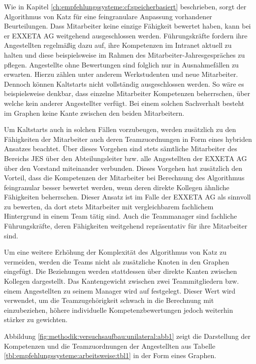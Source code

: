 Wie in Kapitel \ref{ch:empfehlungssysteme:cf:speicherbasiert} beschrieben, sorgt der Algorithmus von Katz für eine feingranulare Anpassung vorhandener Beurteilungen. Dass Mitarbeiter keine einzige Fähigkeit bewertet haben, kann bei er EXXETA AG weitgehend ausgeschlossen werden. Führungskräfte fordern ihre Angestellten regelmäßig dazu auf, ihre Kompetenzen im Intranet aktuell zu halten und diese beispielsweise im Rahmen des Mitarbeiter-Jahresgespräches zu pflegen. Angestellte ohne Bewertungen sind folglich nur in Ausnahmefällen zu erwarten. Hierzu zählen unter anderem Werkstudenten und neue Mitarbeiter. Dennoch können Kaltstarts nicht vollständig ausgeschlossen werden. So wäre es beispielsweise denkbar, dass einzelne Mitarbeiter Kompetenzen beherrschen, über welche kein anderer Angestellter verfügt. Bei einem solchen Sachverhalt besteht im Graphen keine Kante zwischen den beiden Mitarbeitern.

Um Kaltstarts auch in solchen Fällen vorzubeugen, werden zusätzlich zu den Fähigkeiten der Mitarbeiter auch deren Teamzuordnungen in Form eines hybriden Ansatzes beachtet. Über dieses Vorgehen sind stets sämtliche Mitarbeiter des Bereichs \acl{JES} über den Abteilungsleiter bzw. alle Angestellten der EXXETA AG über den Vorstand miteinander verbunden. Dieses Vorgehen hat zusätzlich den Vorteil, dass die Kompetenzen der Mitarbeiter bei Berechnung des Algorithmus feingranular besser bewertet werden, wenn deren direkte Kollegen ähnliche Fähigkeiten beherrschen. Dieser Ansatz ist im Falle der EXXETA AG als sinnvoll zu bewerten, da dort stets Mitarbeiter mit vergleichbarem fachlichem Hintergrund in einem Team tätig sind. Auch die Teammanager sind fachliche Führungskräfte, deren Fähigkeiten weitgehend repräsentativ für ihre Mitarbeiter sind.

Um eine weitere Erhöhung der Komplexität des Algorithmus von Katz zu vermeiden, werden die Teams nicht als zusätzliche Knoten in den Graphen eingefügt. Die Beziehungen werden stattdessen über direkte Kanten zwischen Kollegen dargestellt. Das Kantengewicht zwischen zwei Teammitgliedern bzw. einem Angestellten zu seinem Manager wird auf \teamgewichtString festgelegt. Dieser Wert wird verwendet, um die Teamzugehörigkeit schwach in die Berechnung mit einzubeziehen, höhere individuelle Kompetenzbewertungen jedoch weiterhin stärker zu gewichten.

Abbildung \ref{fig:methodik:versuchsaufbau:unilateral:abb1} zeigt die Darstellung der Kompetenzen und die Teamzuordnungen der Angestellten aus Tabelle \ref{tbl:empfehlungssysteme:arbeitsweise:tbl1} in der Form eines Graphen.

